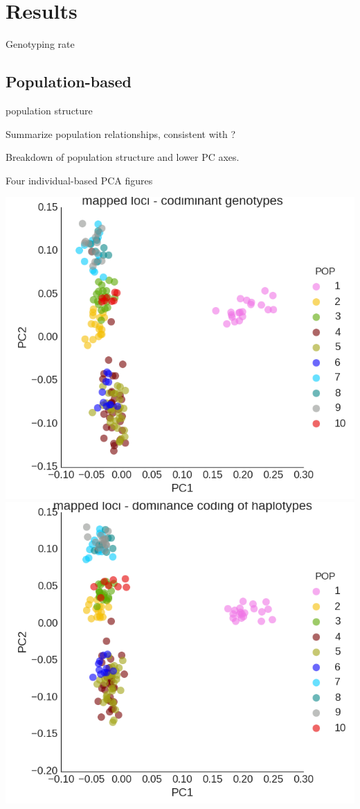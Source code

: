 \documentclass[12pt, one column]{article}
\begin{document}
\section*{Results}

Genotyping rate
\subsection*{Population-based}
population structure

Summarize population relationships, consistent with \citet{Small2014}?

Breakdown of population structure and lower PC axes.

Four individual-based PCA figures

\includegraphics[scale=.3]{figures/PCA_codom.png}
\includegraphics[scale=.3]{figures/PCA_dom.png}
\end{document}
